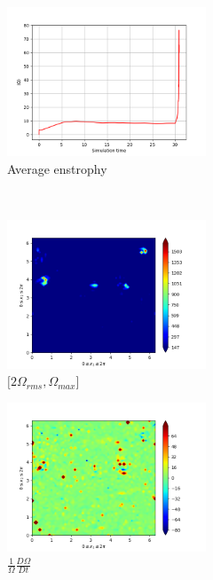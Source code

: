 \begin{figure}[H]
    \begin{subfigure}[H]{0.45\textwidth}
        \includegraphics[height=1.75in]{media/run-cds-65/enst-average1420.png}
        \caption{Average enstrophy}
    \end{subfigure}
    ~
    \begin{subfigure}[H]{0.45\textwidth}
        \includegraphics[height=1.75in]{media/run-cds-65/enst-2-1420.png}
        \caption{$[2\Omega_{rms}, \Omega_{max} $] }
    \end{subfigure}
    \newline
    \begin{subfigure}[H]{0.45\textwidth}
        \includegraphics[height=1.75in]{media/run-cds-65/enst-1420.png}
        \caption{$\frac{1}{\Omega} \frac{D \Omega}{Dt}$}
    \end{subfigure}
    ~
    \begin{subfigure}{0.45\textwidth}

\end{subfigure}
\end{figure}

